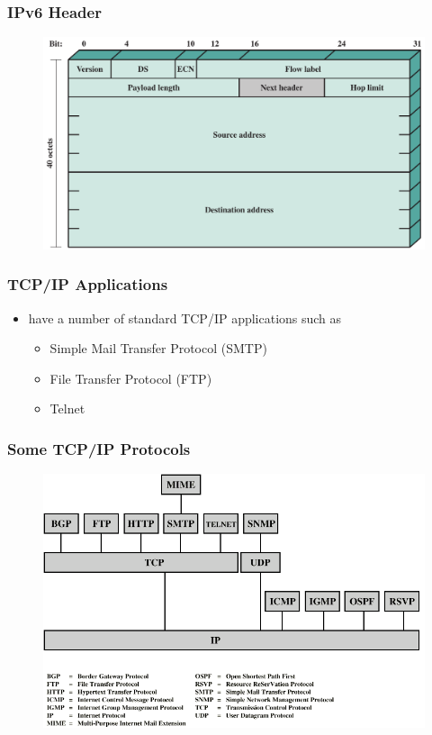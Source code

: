 \documentclass[pdflatex,compress]{beamer}
\begin{document}
\begin{frame}
	\frametitle{IPv6 Header}
	\begin{figure}
		\centering
		\includegraphics[width=\linewidth]{img/img06a}
	\end{figure}
\end{frame}

\begin{frame}
	\frametitle{TCP/IP Applications}
	\begin{itemize}
		\item have a number of standard TCP/IP applications such as
		\begin{itemize}
			\item Simple Mail Transfer Protocol (SMTP)
			\item File Transfer Protocol (FTP)
			\item Telnet
		\end{itemize}
	\end{itemize}
\end{frame}

\begin{frame}
	\frametitle{Some TCP/IP Protocols}
	\begin{figure}
		\centering
		\includegraphics[width=\linewidth]{img/img07}
	\end{figure}
\end{frame}
\end{document}

